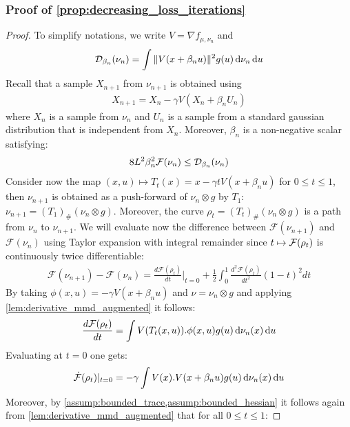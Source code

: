 \subsubsection{Proof of \cref{prop:decreasing_loss_iterations}}\label{eq:proof_decreasing_noisy_loss}
\begin{proof}
To simplify notations, we write $V = \nabla f_{\mu,\nu_n}$ and 
	\[
	\mathcal{D}_{\beta_n}(\nu_n)  = \int \Vert V(x+\beta_n u) \Vert^2 g(u)\mathop{}\!\mathrm{d} \nu_n \mathop{}\!\mathrm{d} u  
	\]
	Recall that a sample $X_{n+1}$ from $\nu_{n+1}$ is obtained using 
	\begin{align}
		X_{n+1} = X_n - \gamma V(X_n+ \beta_n U_n)
	\end{align}
	where $X_n$ is a sample from $\nu_n$ and $U_n$ is a sample from a standard gaussian distribution that is independent from $X_n$. Moreover, $\beta_n$ is a non-negative scalar satisfying:
	\begin{align}\label{eq:control_noise_level_bis}
		8L^2\beta_n^2 {{\mathcal F}}(\nu_n) \leq \mathcal{D}_{\beta_n}(\nu_n)  
	\end{align}
	 Consider now the map $(x,u)\mapsto T_t(x)= x - \gamma tV(x+\beta_n u)$ for $0\leq t\leq 1$, then $\nu_{n+1}$ is obtained as a push-forward of $\nu_n\otimes g$ by $T_1$: $\nu_{n+1} = (T_1)_{\#}(\nu_n\otimes g)$. Moreover, the curve $\rho_t = (T_t)_{\#}(\nu_n\otimes g)$ is a path from $\nu_n$ to $\nu_{n+1}$. 
	 We will evaluate now the difference between $\mathcal{F}(\nu_{n+1})$ and $\mathcal{F}(\nu_{n})$ using  Taylor expansion with integral remainder since $t\mapsto {{\mathcal F}}(\rho_t)$ is continuously twice differentiable:
	\begin{align}\label{eq:taylor_expansion}
	\mathcal{F}(\nu_{n+1})-\mathcal{F}(\nu_{n})= \frac{d \mathcal{F}(\rho_t) }{dt}\vert_{t=0}+ \frac{1}{2} \int_0^1 \frac{d^2 \mathcal{F}(\rho_t)}{dt^2}(1-t)^2 dt 
	\end{align} 
	By taking $\phi(x,u) = - \gamma V(x+\beta_n u)$ and $ \nu = \nu_n\otimes g $  and applying \cref{lem:derivative_mmd_augmented} it follows:
	\begin{align*}
	\frac{d \mathcal{F}(\rho_t) }{dt} =\int V(T_t(x,u)).\phi(x,u) g(u)\mathop{}\!\mathrm{d}\nu_n(x)\mathop{}\!\mathrm{d} u
	\end{align*}
	Evaluating at $t=0$ one gets:
	\begin{align}
		\dot{{{\mathcal F}}}(\rho_t)\vert_{t=0} = -\gamma \int  V(x).V(x+\beta_n u) g(u)\mathop{}\!\mathrm{d}\nu_n(x)\mathop{}\!\mathrm{d} u
	\end{align}
	Moreover, by \cref{assump:bounded_trace,assump:bounded_hessian} it follows again from \cref{lem:derivative_mmd_augmented} that for all $0\leq t\leq 1$:

\end{proof}
